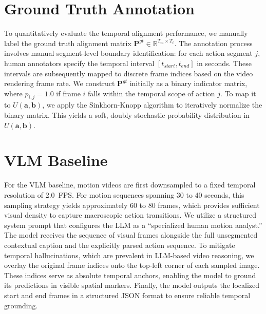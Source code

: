 \section{Ground Truth Annotation} 
To quantitatively evaluate the temporal alignment performance, we manually label the ground truth alignment matrix $\mathbf{P}^{gt} \in \mathbb{R}^{T_m \times T_t}$. The annotation process involves manual segment-level boundary identification: for each action segment $j$, human annotators specify the temporal interval $[t_{start}, t_{end}]$ in seconds. These intervals are subsequently mapped to discrete frame indices based on the video rendering frame rate. We construct $\mathbf{P}^{gt}$ initially as a binary indicator matrix, where $p_{i,j}=1.0$ if frame $i$ falls within the temporal scope of action $j$. To map it to $U(\mathbf{a},\mathbf{b})$, we apply the Sinkhorn-Knopp algorithm to iteratively normalize the binary matrix. This yields a soft, doubly stochastic probability distribution in $U(\mathbf{a},\mathbf{b})$. 


\section{VLM Baseline}
For the VLM baseline, motion videos are first downsampled to a fixed temporal resolution of 2.0~FPS. For motion sequences spanning 30 to 40 seconds, this sampling strategy yields approximately 60 to 80 frames, which provides sufficient visual density to capture macroscopic action transitions. We utilize a structured system prompt that configures the LLM as a ``specialized human motion analyst.'' The model receives the sequence of visual frames alongside the full unsegmented contextual caption and the explicitly parsed action sequence. To mitigate temporal hallucinations, which are prevalent in LLM-based video reasoning, we overlay the original frame indices onto the top-left corner of each sampled image. These indices serve as absolute temporal anchors, enabling the model to ground its predictions in visible spatial markers. Finally, the model outputs the localized start and end frames in a structured JSON format to ensure reliable temporal grounding.
